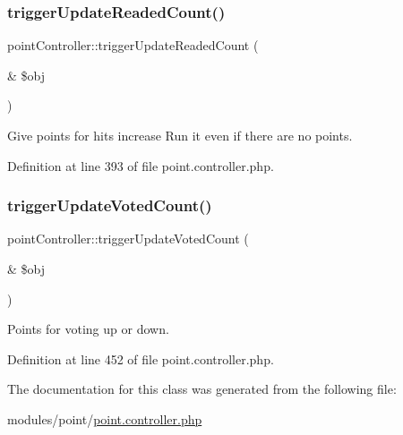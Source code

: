 \hypertarget{classpointController_a6f9b3f42509f0d9555197d525f114377}{}\label{classpointController_a6f9b3f42509f0d9555197d525f114377} 
\subsubsection{\texorpdfstring{trigger\+Update\+Readed\+Count()}{triggerUpdateReadedCount()}}
{\footnotesize\ttfamily point\+Controller\+::trigger\+Update\+Readed\+Count (\begin{DoxyParamCaption}\item[{\&}]{\$obj }\end{DoxyParamCaption})}



Give points for hits increase Run it even if there are no points. 



Definition at line 393 of file point.\+controller.\+php.

\hypertarget{classpointController_a78d6e1a06de73d2443338c322d136ab5}{}\label{classpointController_a78d6e1a06de73d2443338c322d136ab5} 
\subsubsection{\texorpdfstring{trigger\+Update\+Voted\+Count()}{triggerUpdateVotedCount()}}
{\footnotesize\ttfamily point\+Controller\+::trigger\+Update\+Voted\+Count (\begin{DoxyParamCaption}\item[{\&}]{\$obj }\end{DoxyParamCaption})}



Points for voting up or down. 



Definition at line 452 of file point.\+controller.\+php.



The documentation for this class was generated from the following file\+:\begin{DoxyCompactItemize}
\item 
modules/point/\hyperlink{point_8controller_8php}{point.\+controller.\+php}\end{DoxyCompactItemize}

